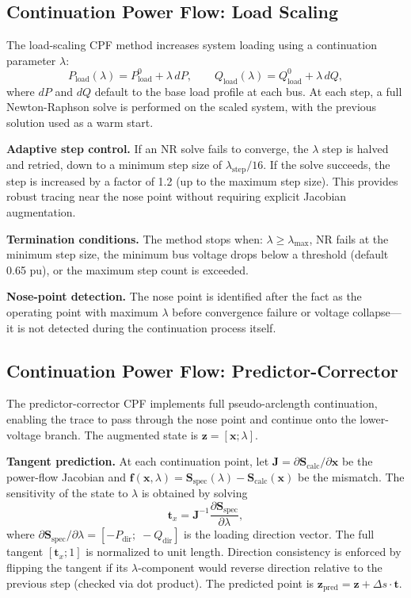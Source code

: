 \documentclass[12pt,a4paper]{article}
\begin{document}
\subsection{Continuation Power Flow: Load Scaling}

The load-scaling CPF method increases system loading using a continuation parameter $\lambda$:
\[
P_{\text{load}}(\lambda) = P_{\text{load}}^0 + \lambda \, dP, \qquad
Q_{\text{load}}(\lambda) = Q_{\text{load}}^0 + \lambda \, dQ,
\]
where $dP$ and $dQ$ default to the base load profile at each bus. At each step, a full Newton-Raphson solve is performed on the scaled system, with the previous solution used as a warm start.

\textbf{Adaptive step control.} If an NR solve fails to converge, the $\lambda$ step is halved and retried, down to a minimum step size of $\lambda_{\text{step}}/16$. If the solve succeeds, the step is increased by a factor of 1.2 (up to the maximum step size). This provides robust tracing near the nose point without requiring explicit Jacobian augmentation.

\textbf{Termination conditions.} The method stops when: $\lambda \ge \lambda_{\max}$, NR fails at the minimum step size, the minimum bus voltage drops below a threshold (default 0.65 pu), or the maximum step count is exceeded.

\textbf{Nose-point detection.} The nose point is identified after the fact as the operating point with maximum $\lambda$ before convergence failure or voltage collapse---it is not detected during the continuation process itself.

\subsection{Continuation Power Flow: Predictor-Corrector}

The predictor-corrector CPF implements full pseudo-arclength continuation, enabling the trace to pass through the nose point and continue onto the lower-voltage branch. The augmented state is $\mathbf{z} = [\mathbf{x}; \lambda]$.

\textbf{Tangent prediction.} At each continuation point, let $\mathbf{J} = \partial\mathbf{S}_{\text{calc}}/\partial\mathbf{x}$ be the power-flow Jacobian and $\mathbf{f}(\mathbf{x},\lambda) = \mathbf{S}_{\text{spec}}(\lambda) - \mathbf{S}_{\text{calc}}(\mathbf{x})$ be the mismatch. The sensitivity of the state to $\lambda$ is obtained by solving
\[
\mathbf{t}_x = \mathbf{J}^{-1} \frac{\partial \mathbf{S}_{\text{spec}}}{\partial \lambda},
\]
where $\partial \mathbf{S}_{\text{spec}}/\partial \lambda = [-P_{\text{dir}};\; -Q_{\text{dir}}]$ is the loading direction vector. The full tangent $[\mathbf{t}_x; 1]$ is normalized to unit length. Direction consistency is enforced by flipping the tangent if its $\lambda$-component would reverse direction relative to the previous step (checked via dot product). The predicted point is $\mathbf{z}_{\text{pred}} = \mathbf{z} + \Delta s \cdot \mathbf{t}$.
\end{document}
